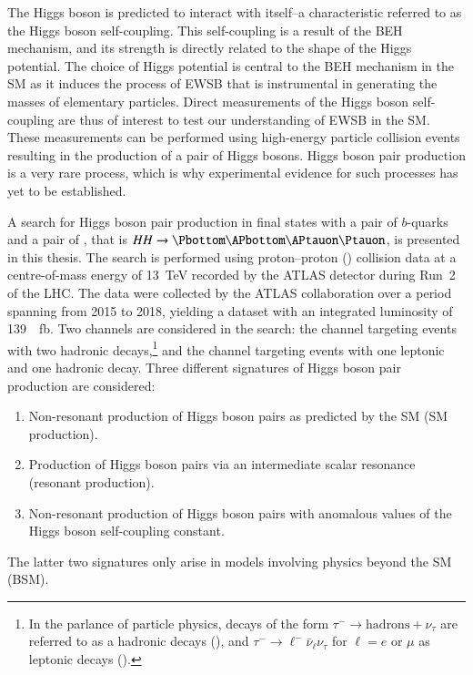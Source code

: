 
%

The Higgs boson is predicted to interact with itself--a characteristic referred
to as the Higgs boson self-coupling. This self-coupling is a result of the BEH
mechanism, and its strength is directly related to the shape of the Higgs
potential. The choice of Higgs potential is central to the BEH mechanism in the
SM as it induces the process of EWSB that is instrumental in generating the
masses of elementary particles. Direct measurements of the Higgs boson
self-coupling are thus of interest to test our understanding of EWSB in the SM.
These measurements can be performed using high-energy particle collision events
resulting in the production of a pair of Higgs bosons. Higgs boson pair
production is a very rare process, which is why experimental evidence for such
processes has yet to be established.

A search for Higgs boson pair production in final states with a pair of
$b$-quarks and a pair of \tauleptons, that is $HH \to \bbtautau$, is presented
in this thesis. The search is performed using proton--proton (\pp) collision
data at a centre-of-mass energy of \SI{13}{\TeV} recorded by the ATLAS detector
during Run~2 of the LHC. The data were collected by the ATLAS collaboration over
a period spanning from 2015 to 2018, yielding a dataset with an integrated
luminosity of \SI{139}{\per\femto\barn}. Two channels are considered in the
search: the \hadhad channel targeting events with two hadronic \taulepton
decays,\footnote{In the parlance of particle physics, decays of the form
  $\tau^- \to \text{hadrons} + \nu_\tau$ are referred to as a hadronic
  \taulepton decays (\tauhad), and $\tau^- \to \ell^- \bar{\nu}_\ell \nu_\tau$
  for $\ell = e$ or $\mu$ as leptonic \taulepton decays (\taulep).} and the
\lephad channel targeting events with one leptonic and one hadronic \taulepton
decay. Three different signatures of Higgs boson pair production are considered:
\begin{enumerate}

\item Non-resonant production of Higgs boson pairs as predicted by the SM (SM
  \HH production).

\item Production of Higgs boson pairs via an intermediate scalar resonance
  (resonant \HH production).

\item Non-resonant production of Higgs boson pairs with anomalous values of the
  Higgs boson self-coupling constant.

\end{enumerate}
The latter two signatures only arise in models involving physics beyond the SM
(BSM).


